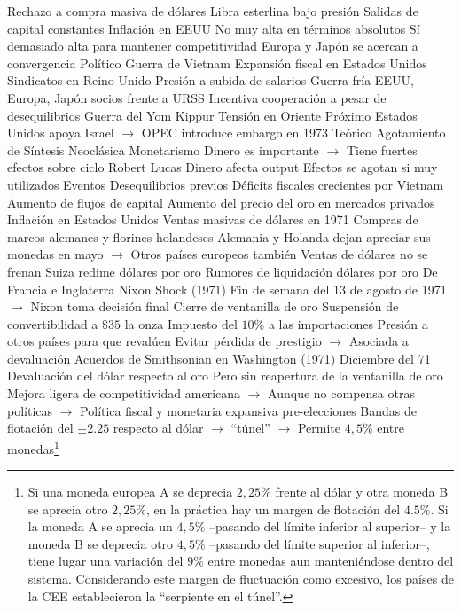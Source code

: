 \documentclass{nuevotema}
\begin{document}
\begin{esquemal}
				\4[] Rechazo a compra masiva de dólares
				\4 Libra esterlina bajo presión
				\4[] Salidas de capital constantes
				\4 Inflación en EEUU
				\4[] No muy alta en términos absolutos
				\4[] Sí demasiado alta para mantener competitividad
				\4 Europa y Japón se acercan a convergencia
			\3 Político
				\4 Guerra de Vietnam
				\4[] Expansión fiscal en Estados Unidos
				\4 Sindicatos en Reino Unido
				\4[] Presión a subida de salarios
				\4 Guerra fría
				\4[] EEUU, Europa, Japón socios frente a URSS
				\4[] Incentiva cooperación a pesar de desequilibrios
				\4 Guerra del Yom Kippur
				\4[] Tensión en Oriente Próximo
				\4[] Estados Unidos apoya Israel
				\4[] $\to$ OPEC introduce embargo en 1973
			\3 Teórico
				\4 Agotamiento de Síntesis Neoclásica
				\4 Monetarismo
				\4[] Dinero es importante
				\4[] $\to$ Tiene fuertes efectos sobre ciclo
				\4 Robert Lucas
				\4[] Dinero afecta output
				\4[] Efectos se agotan si muy utilizados
		\2 Eventos
			\3 Desequilibrios previos
				\4 Déficits fiscales crecientes por Vietnam
				\4 Aumento de flujos de capital
				\4 Aumento del precio del oro en mercados privados
				\4 Inflación en Estados Unidos
			\3 Ventas masivas de dólares en 1971
				\4 Compras de marcos alemanes y florines holandeses
				\4[] Alemania y Holanda dejan apreciar sus monedas en mayo
				\4[] $\to$ Otros países europeos también
				\4 Ventas de dólares no se frenan
				\4 Suiza redime dólares por oro
				\4 Rumores de liquidación dólares por oro
				\4[] De Francia e Inglaterra
			\3 Nixon Shock (1971)
				\4 Fin de semana del 13 de agosto de 1971
				\4[] $\to$ Nixon toma decisión final
				\4 Cierre de ventanilla de oro
				\4[] Suspensión de convertibilidad a $\$35$ la onza
				\4 Impuesto del $10\%$ a las importaciones
				\4 Presión a otros países para que revalúen
				\4[] Evitar pérdida de prestigio
				\4[] $\to$ Asociada a devaluación
			\3 Acuerdos de Smithsonian en Washington (1971)
				\4 Diciembre del 71
				\4 Devaluación del dólar respecto al oro
				\4[] Pero sin reapertura de la ventanilla de oro
				\4[] Mejora ligera de competitividad americana
				\4[] $\to$ Aunque no compensa otras políticas
				\4[] $\to$ Política fiscal y monetaria expansiva pre-elecciones
				\4 Bandas de flotación del $\pm 2.25$ respecto al dólar
				\4[] $\to$ ``túnel''
				\4[] $\to$ Permite $4,5\%$ entre monedas\footnote{Si una moneda europea A se deprecia $2,25\%$ frente al dólar y otra moneda B se aprecia otro $2,25\%$, en la práctica hay un margen de flotación del $4.5\%$. Si la moneda A se aprecia un $4,5\%$ --pasando del límite inferior al superior-- y la moneda B se deprecia otro $4,5\%$ --pasando del límite superior al inferior--, tiene lugar  una variación del $9\%$ entre monedas aun manteniéndose dentro del sistema. Considerando este margen de fluctuación como excesivo, los países de la CEE establecieron la ``serpiente en el túnel''.}

\end{esquemal}
\end{document}
